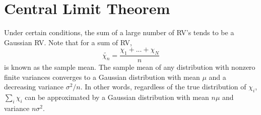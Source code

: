 \documentclass{article}
\begin{document}
    \section{Central Limit Theorem}
    Under certain conditions, the sum of a large number of RV's tends to be a Gaussian RV. Note that for a sum of RV, 
    \begin{equation}
        \tilde{\chi_n} = \frac{\chi_1 + ... + \chi_N}{n}
    \end{equation}
    is known as the sample mean. The sample mean of any distribution with nonzero finite variances converges to a Gaussian
    distribution with mean $\mu$ and a decreasing variance $\sigma^2/n$. In other words, regardless of the true 
    distribution of $\chi_i$, $\sum_i \chi_i$ can be approximated by a Gaussian distribution with mean $n\mu$ and variance
    $n\sigma^2$.
\end{document}
